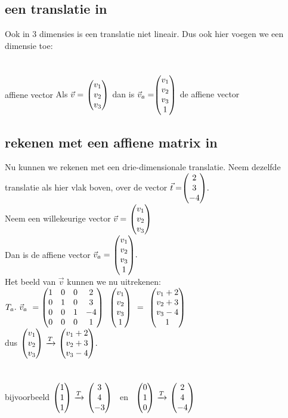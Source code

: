 \subsection{een translatie in \RD}
Ook in 3 dimensies is een translatie niet lineair. Dus ook hier voegen we een dimensie toe:
\\ \\
\\          
\mydef 
{affiene vector \RD}
{ Als $\vec{v} = \ \vecdriesnel{v} $ \quad dan is \quad 
	$\vec{v}_a = \vecvier{v_1} {v_2} {v_3} {1}  $ \quad de affiene vector }\\


\subsection{rekenen met een affiene  matrix in \RD}
Nu kunnen we rekenen met een drie-dimensionale translatie.
Neem dezelfde translatie als hier vlak boven, over de vector $ \vec{t}=  \vecdrie{2}{3}{-4}. $ \\
Neem een willekeurige  vector $\vec{v} = \ \vecdriesnel{v} $\\  Dan is de affiene vector  $\vec{v}_a = \  \vecvier{v_1} {v_2} {v_3} {1} . $\\ 
Het beeld van $\vec{v} $ kunnen we nu uitrekenen:
$ T_a  . \ \vec{v}_a \ 
=   \matvier{ 1 & 0 & 0 & 2} 
{ 0 & 1 & 0 &  3}  
{ 0 & 0 & 1 &  -4 } 
{0 & 0 &  0 & 1 } \ \  \vecvier{v_1} {v_2} {v_3} {1} \ \ 
= \ \  \vecvier{v_1 + 2} {v_2 + 3 } {v_3 - 4 } {1} $ \\
dus 
\quad \quad \quad $ \vecdriesnel{v}  \  \xrightarrow{T}   \   \vecdrie{v_1+2} {v_2+3} {v_3-4} . $ 
\\ \\ \\
bijvoorbeeld 
$ \vecdrie{1}{1}{1}  \  \xrightarrow{T}   \   \vecdrie{3} {4} {-3} $ \ \quad en \
\quad $ \vecdrie{0}{1}{0}  \  \xrightarrow{T}   \   \vecdrie{2} {4} {-4} $ 

